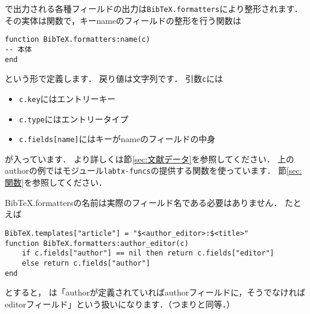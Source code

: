\documentclass[a4paper]{ltjsarticle}
\newcommand*{\luavar}[1]{\texttt{#1}}
\begin{document}
で出力される各種フィールドの出力は\luavar{BibTeX.formatters}により整形されます．%
その実体は関数で，キーnameのフィールドの整形を行う関数は
\begin{lstlisting}
function BibTeX.formatters:name(c)
-- 本体
end
\end{lstlisting}
という形で定義します．
戻り値は文字列です．
引数\luavar{c}には
\begin{itemize}
\item \luavar{c.key}にはエントリーキー
\item \luavar{c.type}にはエントリータイプ
\item \luavar{c.fields[name]}にはキーがnameのフィールドの中身
\end{itemize}
が入っています．
より詳しくは節\ref{sec:文献データ}を参照してください．
上のauthorの例ではモジュール\luavar{labtx-funcs}の提供する関数を使っています．
節\ref{sec:関数}を参照してください．

BibTeX.formattersの名前は実際のフィールド名である必要はありません．
たとえば
\begin{lstlisting}
BibTeX.templates["article"] = "$<author_editor>:$<title>"
function BibTeX.formatters:author_editor(c)
    if c.fields["author"] == nil then return c.fields["editor"]
    else return c.fields["author"]
end
\end{lstlisting}
とすると，%
は「authorが定義されていればauthorフィールドに，そうでなければeditorフィールド」という扱いになります．（つまりと同等．）%
\end{document}
